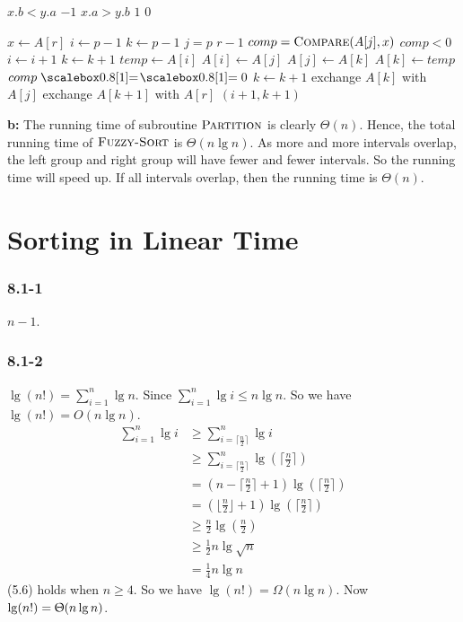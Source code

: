 \documentclass{book}
\begin{document}
\begin{CJK}{UTF8}{gkai}
\begin{codebox}
\li \If $x.b < y.a$
\li \Then \Return $-1$
\li \ElseIf $x.a > y.b$
\li \Then \Return $1$
\li \Else \Return $0$
\end{codebox}


\begin{codebox}
\li $x \gets A[r]$
\li $i \gets p-1$
\li $k \gets p-1$
\li \For $j=p$ \To $r-1$
\li \Do $comp = \textnormal{\scshape Compare}(A[j], x)$
\li \If $comp < 0$
\li \Then $i \gets i+1$
\li $k \gets k+1$
\li $temp \gets A[i]$
\li $A[i] \gets A[j]$
\li $A[j] \gets A[k]$
\li $A[k] \gets temp$
\li \ElseIf $comp \isequal 0$
\li \Then $k \gets k+1$
\li exchange $A[k]$ with $A[j]$
\End
\End
\li exchange $A[k+1]$ with $A[r]$
\li \Return $(i+1,k+1)$
\end{codebox}

\textbf{b:} The running time of subroutine $\textnormal{\scshape Partition}$ is clearly 
$\Theta(n)$.  Hence, the total running time of $\textnormal{\scshape Fuzzy-Sort}$ is $\Theta(n 
\lg n)$.  As more and more intervals overlap, the left group and right group 
will have fewer and fewer intervals. So the running time will speed up. If all 
intervals overlap, then the running time is $\Theta(n)$.

\chapter{Sorting in Linear Time}
\subsection*{8.1-1} $n-1$.
\subsection*{8.1-2} $\lg(n!) = \sum_{i=1}^{n}\lg n$. Since $\sum_{i=1}^{n}\lg i \le 
n\lg n$. So we have $\lg(n!) = O(n\lg n)$.
\begin{align}
\sum_{i=1}^{n}\lg i & \ge \sum_{i=\lceil\frac{n}{2}\rceil}^{n}\lg i \\
& \ge \sum_{i=\lceil\frac{n}{2}\rceil}^{n}\lg(\lceil\frac{n}{2}\rceil) \\
& = (n-\lceil\frac{n}{2}\rceil+1)\lg(\lceil\frac{n}{2}\rceil) \\
& = (\lfloor\frac{n}{2}\rfloor+1)\lg(\lceil\frac{n}{2}\rceil) \\
& \ge \frac{n}{2}\lg(\frac{n}{2}) \\
& \ge \frac{1}{2}n\lg\sqrt n \\
& = \frac{1}{4}n\lg n
\end{align}
(5.6) holds when $n \ge 4$. So we have $\lg(n!) = \Omega(n\lg n)$. Now $\lg(n!) 
= \Uptheta(n\lg n)$.


\end{CJK}
\end{document}
